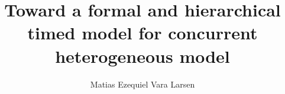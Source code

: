 \documentclass[a4paper,12pt,twoside]{report}
\begin{document}
\title{\LARGE {\bf Toward a formal and hierarchical timed model for concurrent heterogeneous model}\\
 \vspace*{6mm}
}

\author{Matias Ezequiel Vara Larsen}

\normallinespacing
\maketitle

\preface





\body









\appendix





\end{document}
